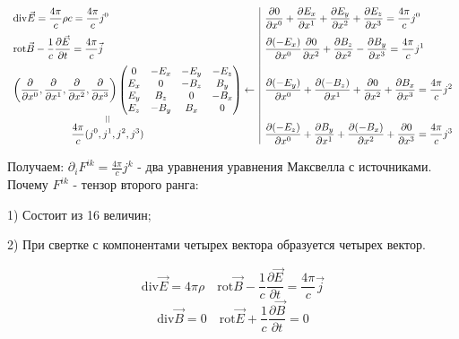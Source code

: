 \documentclass[12pt, a4paper]{report}
\begin{document}
\[ \begin{array}{l|l}
    \displaystyle \mathrm{div }  \vec{E }  = \frac{4\pi}{c }  \rho c = \frac{4\pi}{c }  j^0 & \displaystyle  \frac{\partial  0 }{\partial  x ^0 } + \frac{\partial E_x }{\partial  x^1 }+ \frac{\partial E_y}{ \partial  x ^2 } + \frac{\partial  E_z } {\partial  x^3 } = \frac{4\pi}{c }  j^0 \\[10pt]
    \displaystyle \mathrm{rot } \vec{B } -\frac{1}{c }  \frac{\partial  \vec{E } }{\partial  t } = \frac{4\pi}{c }  \vec{ j}  & \displaystyle  \frac{\partial (- E_x)}{\partial  x^0 } \frac{\partial  0 }{\partial  x^2 } + \frac{\partial  B_z }{\partial  x^2 } - \frac{\partial  B_y }{\partial  x^3 } = \frac{4\pi}{c }  j^1 \\[10pt]
    \displaystyle  \left( \frac{\partial  }{ \partial  x ^0 }, \frac{\partial}{ \partial  x ^1 } , \frac{\partial  }{\partial  x^2 } , \frac{\partial  }{\partial  x^3 }     \right)  \begin{pmatrix}
    0  & - E_x  & - E_y  & -E_z\\
    E_x  & 0  & - B_z  & B_y \\
    E_y  & B_z  & 0  & - B_x \\
    E_z  & -B_y  & B_x  & 0
    \end{pmatrix} \leftarrow&\displaystyle \frac{\partial  (-E_y )}{\partial  x^0 } + \frac{\partial  (- B_z )}{\partial  x^1 } + \frac{\partial  0 } {\partial  x^2 } + \frac{\partial  B_x }{\partial  x^3 } = \frac{4\pi}{c }  j^2  \\[10pt]
    \kern+2cm\displaystyle \overset{||}{\frac{4\pi}{c } (j^0 , j^1 , j^2 , j^3) }& \displaystyle \frac{\partial (- E_z )}{\partial  x^0 } + \frac{\partial  B_y }{\partial  x^1 } + \frac{\partial  (- B_x )}{\partial  x^2 } + \frac{\partial  0 }{\partial  x^3 } = \frac{4\pi}{c }  j^3              
\end{array} \] 

Получаем: \( \displaystyle  \boxed{\partial _i F^{ik }  = \frac{4\pi}{c }  j^k} \) - два уравнения  уравнения Максвелла с источниками. \\

Почему \( F^{ik }  \) - тензор второго ранга: 

1) Состоит из 16 величин; 

2) При свертке с компонентами четырех вектора образуется четырех вектор.

\[ \mathrm{div } \vec{ E }   =4 \pi \rho  \quad  \mathrm{ rot } \vec{B }  - \frac{1}{c }  \frac{\partial  \vec{ E } }{\partial  t } = \frac{4\pi}{c }  \vec{ j}       \] 
\[ \mathrm{div }  \vec{B }  = 0 \quad  \mathrm{rot }  \vec{ E }  + \frac{1}{c }  \frac{\partial  \vec{B } }{\partial  t } = 0    \] 
\end{document}
